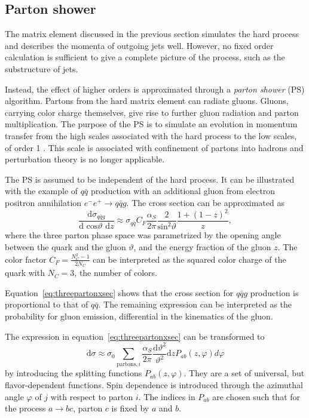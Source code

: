 \subsection{Parton shower}

The matrix element discussed in the previous section simulates the hard process and
describes the momenta of outgoing jets well.
However, no fixed order calculation is sufficient to give a complete picture of the
process, such as the substructure of jets.

Instead, the effect of higher orders is approximated through
a \textit{parton shower} (PS) algorithm.
Partons from the hard matrix element can radiate gluons.
Gluons, carrying color charge themselves, give rise to further
gluon radiation and parton multiplication.
The purpose of the PS is to simulate an evolution in momentum transfer
from the high scales associated with the hard process to the low scales, of order 1 \GeV.
This scale is associated with confinement of partons into hadrons
and perturbation theory is no longer applicable.

The PS is assumed to be independent of the hard process.
It can be illustrated with the example
of $q\bar{q}$ production with an additional gluon from electron positron annihilation
$e^- e^+ \rightarrow q\bar{q}g$.
The cross section can be approximated as~\cite{Buckley_2011}
\begin{equation}
    \frac{\text{d}\sigma_{q\bar{q}g}}{\text{d cos}\vartheta \text{ d}z} \approx
    \sigma_{q\bar{q}}C_F \frac{\alpha_S}{2\pi}\frac{2}{\text{sin}^2\vartheta} \frac{1+(1-z)^2}{z},
    \label{eq:threepartonxsec}
\end{equation}
where the three parton phase space was parametrized by the opening angle
between the quark and the gluon $\vartheta$, and the energy fraction of the gluon $z$.
The color factor $C_F = \frac{N_C^2 - 1}{2N_C}$ can be interpreted as the squared color charge of the quark with $N_C = 3$, the number of colors.

Equation~\eqref{eq:threepartonxsec} shows that the cross section for 
$q\bar{q}g$ production is proportional to that of
$q\bar{q}$. The remaining expression can be
interpreted as the probability for gluon emission, differential in the
kinematics of the gluon.

The expression in equation~\eqref{eq:threepartonxsec} can be transformed to~\cite{Buckley_2011}
\begin{equation}
    \text{d}\sigma \approx \sigma_0 \sum_{\text{partons},i} 
    \frac{\alpha_S}{2\pi}\frac{\text{d}\vartheta^2}{\vartheta^2}\text{d}z P_{ab}(z,\varphi)d\varphi
    \label{eq:splitting}
\end{equation}
by introducing the splitting functions 
$P_{ab}(z,\varphi)$.
They are a set of universal, but flavor-dependent functions.
Spin dependence is introduced through the azimuthal angle $\varphi$
of $j$ with respect to parton $i$.
The indices in $P_{ab}$ are chosen such that
for the process $a\rightarrow bc$, parton $c$ is fixed by $a$ and $b$.

